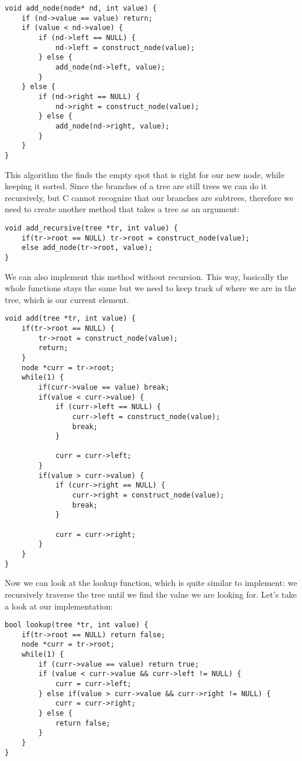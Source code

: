 \documentclass[a4paper,11pt]{article}
\begin{document}
     \begin{verbatim}
void add_node(node* nd, int value) {
    if (nd->value == value) return;
    if (value < nd->value) {
        if (nd->left == NULL) {
            nd->left = construct_node(value);
        } else {
            add_node(nd->left, value);
        }
    } else {
        if (nd->right == NULL) {
            nd->right = construct_node(value);
        } else {
            add_node(nd->right, value);
        }
    }
}
     \end{verbatim}

     This algorithm the finds the empty spot that is right for our new node, while keeping it sorted.
     Since the branches of a tree are still trees we can do it recursively, but C cannot recognize that our branches are subtrees, therefore we need to create another method that takes a tree as an argument:

     \begin{verbatim}
void add_recursive(tree *tr, int value) {
    if(tr->root == NULL) tr->root = construct_node(value);
    else add_node(tr->root, value);
}
     \end{verbatim}

    We can also implement this method without recursion.
    This way, basically the whole functions stays the same but we need to keep track of where we are in the tree, which is our current element.
    \begin{verbatim}
void add(tree *tr, int value) {
    if(tr->root == NULL) {
        tr->root = construct_node(value);
        return;
    }
    node *curr = tr->root;
    while(1) {
        if(curr->value == value) break;
        if(value < curr->value) {
            if (curr->left == NULL) {
                curr->left = construct_node(value);
                break;
            }

            curr = curr->left;
        }
        if(value > curr->value) {
            if (curr->right == NULL) {
                curr->right = construct_node(value);
                break;
            }

            curr = curr->right;
        }
    }
}
    \end{verbatim}


     Now we can look at the lookup function, which is quite similar to implement: we recursively traverse the tree until we find the value we are looking for.
     Let's take a look at our implementation:
     \begin{verbatim}
bool lookup(tree *tr, int value) {
    if(tr->root == NULL) return false;
    node *curr = tr->root;
    while(1) {
        if (curr->value == value) return true;
        if (value < curr->value && curr->left != NULL) {
            curr = curr->left;
        } else if(value > curr->value && curr->right != NULL) {
            curr = curr->right;
        } else {
            return false;
        }
    }
}
    \end{verbatim}
\end{document}
